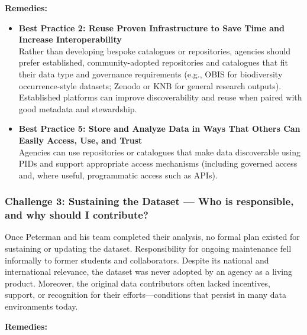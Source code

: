 \documentclass[
  letterpaper,
  DIV=11,
  numbers=noendperiod]{scrartcl}
\begin{document}
\textbf{Remedies:}

\begin{itemize}
\item
  \textbf{Best Practice 2: Reuse Proven Infrastructure to Save Time and
  Increase Interoperability}\\
  Rather than developing bespoke catalogues or repositories, agencies
  should prefer established, community-adopted repositories and
  catalogues that fit their data type and governance requirements (e.g.,
  OBIS for biodiversity occurrence-style datasets; Zenodo or KNB for
  general research outputs). Established platforms can improve
  discoverability and reuse when paired with good metadata and
  stewardship.
\item
  \textbf{Best Practice 5: Store and Analyze Data in Ways That Others
  Can Easily Access, Use, and Trust}\\
  Agencies can use repositories or catalogues that make data
  discoverable using PIDs and support appropriate access mechanisms
  (including governed access and, where useful, programmatic access such
  as APIs).
\end{itemize}

\subsubsection{Challenge 3: Sustaining the Dataset --- Who is
responsible, and why should I
contribute?}\label{challenge-3-sustaining-the-dataset-who-is-responsible-and-why-should-i-contribute}

Once Peterman and his team completed their analysis, no formal plan
existed for sustaining or updating the dataset. Responsibility for
ongoing maintenance fell informally to former students and
collaborators. Despite its national and international relevance, the
dataset was never adopted by an agency as a living product. Moreover,
the original data contributors often lacked incentives, support, or
recognition for their efforts---conditions that persist in many data
environments today.

\textbf{Remedies:}
\end{document}

